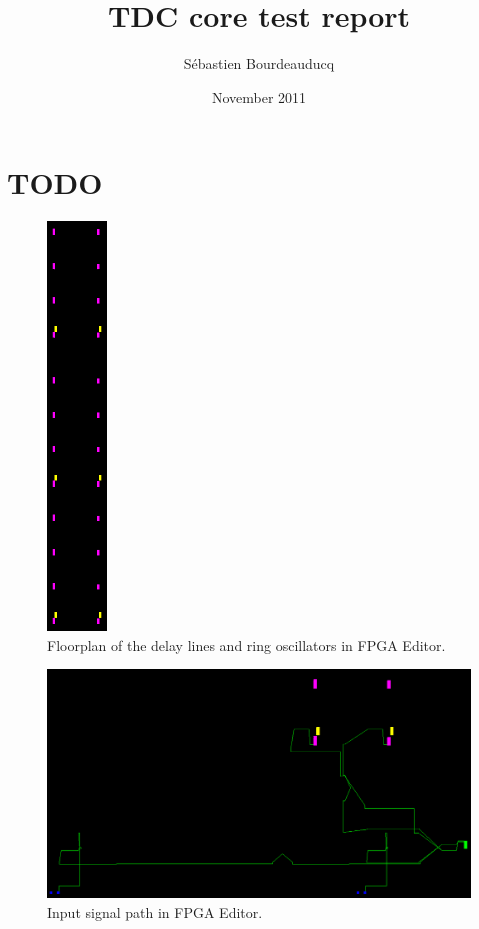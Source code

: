 \documentclass[a4paper,11pt]{article}
\title{TDC core test report}
\author{S\'ebastien Bourdeauducq}
\date{November 2011}
\begin{document}
\setlength{\parindent}{0pt}
\setlength{\parskip}{5pt}
\maketitle{}
\section{TODO}

\begin{figure}[h]
\centering
\includegraphics[width=1.6cm]{floorplan.png}
\caption{Floorplan of the delay lines and ring oscillators in FPGA Editor.}
\label{fig:floorplan}
\end{figure}

\begin{figure}[h]
\includegraphics[width=\textwidth]{input_routes.png}
\caption{Input signal path in FPGA Editor.}
\label{fig:floorplan}
\end{figure}




\end{document}
